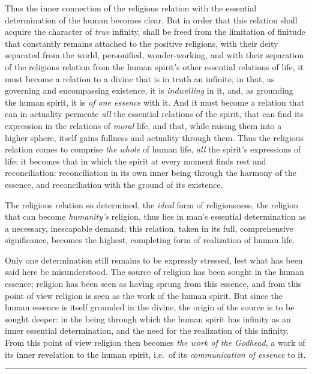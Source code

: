 \documentclass[12pt,a4paper,openany]{book}
\newcommand{\opage}[1]{\marginnote{\footnotesize\textit{[#1]}}}
\begin{document}
Thus the inner connection of the religious relation with the
essential determination of the human becomes clear. But in order that
this relation shall acquire the character of \emph{true} infinity,
shall be freed from the limitation of finitude that constantly remains
attached to the positive religions, with their deity separated from
the world, personified, wonder-working, and with their separation of
the religious relation from the human spirit's other essential
relations of life, it must become a relation to a divine that is in
truth an infinite, in that, as governing and encompassing existence,
it is \emph{indwelling} in it, and, as grounding the human spirit, it
is \emph{of one essence} with it. And it must become a relation that
can in actuality permeate \emph{all} the essential relations of the
spirit, that can find its expression in the relations of \emph{moral}
life, and that, while raising them into a higher sphere, itself gains
fullness and actuality
\opage{500}through them. Thus the religious relation comes to comprise
\emph{the whole} of human life, \emph{all} the spirit's expressions of
life; it becomes that in which the spirit at every moment finds rest
and reconciliation: reconciliation in its own inner being through the
harmony of the essence, and reconciliation with the ground of its
existence.

The religious relation so determined, the \emph{ideal} form of
religiousness, the religion that can become \emph{humanity's} religion,
thus lies in man's essential determination as a necessary,
inescapable demand; this relation, taken in its full, comprehensive
significance, becomes the highest, completing form of realization of
human life.

Only one determination still remains to be expressly stressed, lest
what has been said here be misunderstood. The source of religion has
been sought in the human essence; religion has been seen as having
sprung from this essence, and from this point of view religion is
seen as the work of the human spirit. But since the human essence is
itself grounded in the divine, the origin of the source is to be
sought deeper: in the being through which the human spirit has
infinity as an inner essential determination, and the need for the
realization of this infinity. From this point of view religion then
becomes \emph{the work of the Godhead}, a work of its inner revelation
to the human spirit, i.e.\ of its \emph{communication of essence} to
it.

\begin{center}\rule{1.8cm}{0.4pt}\end{center}
\end{document}
